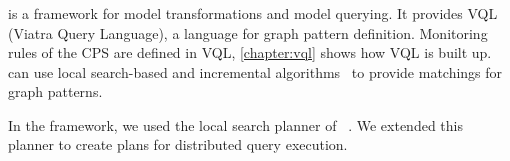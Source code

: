 \subsubsection{\protect\viatra{} }


\viatra{} \cite{viatra} is a framework for model transformations and model querying. 
It provides VQL (Viatra Query Language), a language for graph pattern definition. 
Monitoring rules of the CPS are defined in VQL, \autoref{chapter:vql} shows how VQL is built up.
\viatra{} can use local search-based and incremental algorithms~\cite{viatra-incremental} to provide matchings for graph patterns. 

In the framework, we used the local search planner of \viatra{}~\cite{bur-marton-msc}. We extended this planner to create plans for distributed query execution.





